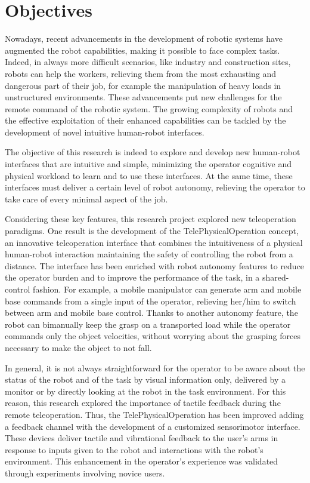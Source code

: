 \section{Objectives}

Nowadays, recent advancements in the development of robotic systems have augmented the robot capabilities, making it possible to face complex tasks. Indeed, in always more difficult scenarios, like industry and construction sites, robots can help the workers, relieving them from the most exhausting and dangerous part of their job, for example the manipulation of heavy loads in unstructured environments. 
These advancements put new challenges for the remote command of the robotic system.
The growing complexity of robots and the effective exploitation of their enhanced capabilities can be tackled by the development of novel intuitive human-robot interfaces. 

The objective of this research is indeed to explore and develop new human-robot interfaces that are intuitive and simple, minimizing the operator cognitive and physical workload to learn and to use these interfaces. At the same time, these interfaces must deliver a certain level of robot autonomy, relieving the operator to take care of every minimal aspect of the job. 

Considering these key features, this research project explored new teleoperation paradigms.
One result is the development of the TelePhysicalOperation concept, an innovative teleoperation interface that combines the intuitiveness of a physical human-robot interaction maintaining the safety of controlling the robot from a distance.
The interface has been enriched with robot autonomy features to reduce the operator burden and to improve the performance of the task, in a shared-control fashion. For example, a mobile manipulator can generate arm and mobile base commands from a single input of the operator, relieving her/him to switch between arm and mobile base control. Thanks to another autonomy feature, the robot can bimanually keep the grasp on a transported load while the operator commands only the object velocities, without worrying about the grasping forces necessary to make the object to not fall. 

In general, it is not always straightforward for the operator to be aware about the status of the robot and of the task by visual information only, delivered by a monitor or by directly looking at the robot in the task environment. For this reason, this research explored the importance of tactile feedback during the remote teleoperation. Thus, the TelePhysicalOperation has been improved adding a feedback channel with the development of a customized sensorimotor interface. These devices deliver tactile and vibrational feedback to the user's arms in response to inputs given to the robot and interactions with the robot's environment. This enhancement in the operator's experience was validated through experiments involving novice users.

